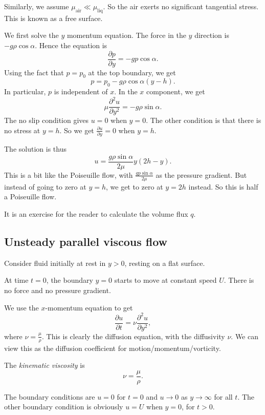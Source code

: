 \documentclass[a4paper]{article}
\begin{document}
Similarly, we assume $\mu_{\mathrm{air}} \ll \mu_{\mathrm{liq}}$. So the air exerts no significant tangential stress. This is known as a free surface.

We first solve the $y$ momentum equation. The force in the $y$ direction is $-g \rho \cos \alpha$. Hence the equation is
\[
  \frac{\partial p}{\partial y} = - gp \cos \alpha.
\]
Using the fact that $p = p_0$ at the top boundary, we get
\[
  p = p_0 - g\rho \cos \alpha (y - h).
\]
In particular, $p$ is independent of $x$. In the $x$ component, we get
\[
  \mu \frac{\partial^2 u}{\partial y^2} = - g\rho \sin \alpha.
\]
The no slip condition gives $u = 0$ when $y = 0$. The other condition is that there is no stress at $y = h$. So we get $\frac{\partial u}{\partial y} = 0$ when $y = h$.

The solution is thus
\[
  u = \frac{g\rho\sin \alpha}{2 \mu} y(2h - y).
\]
This is a bit like the Poiseuille flow, with $\frac{gp \sin \alpha}{2\mu}$ as the pressure gradient. But instead of going to zero at $y = h$, we get to zero at $y = 2h$ instead. So this is half a Poiseuille flow. %

It is an exercise for the reader to calculate the volume flux $q$.

\subsection{Unsteady parallel viscous flow}
Consider fluid initially at rest in $y > 0$, resting on a flat surface.
\begin{center}
\end{center}
At time $t = 0$, the boundary $y = 0$ starts to move at constant speed $U$. There is no force and no pressure gradient.

We use the $x$-momentum equation to get
\[
  \frac{\partial u}{\partial t} = \nu \frac{\partial^2 u}{\partial y^2},
\]
where $\nu = \frac{\mu}{\rho}$. This is clearly the diffusion equation, with the diffusivity $\nu$. We can view this as the diffusion coefficient for motion/momentum/vorticity.
\begin{defi}
  The \emph{kinematic viscosity} is
  \[
    \nu = \frac{\mu}{\rho}.
  \]
\end{defi}
The boundary conditions are $u = 0$ for $t = 0$ and $u \to 0$ as $y \to \infty$ for all $t$. The other boundary condition is obviously $u = U$ when $y = 0$, for $t > 0$.
\end{document}
